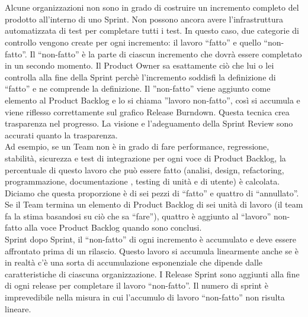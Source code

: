 \newpage
\section*{\color{Blue}{CONSIDERAZIONI FINALI}}
\label{sec:finalthoughts}
Alcune organizzazioni non sono in grado di costruire un incremento completo del prodotto all'interno di uno Sprint. Non possono ancora avere l'infrastruttura automatizzata di test per completare tutti i test. In questo caso, due categorie di controllo vengono create per ogni incremento: il lavoro ``fatto'' e quello ``non-fatto''. Il ``non-fatto'' \`e la parte di ciascun incremento che dovr\`a essere completato in un secondo momento. Il Product Owner sa esattamente ci\`o che lui o lei controlla alla fine della Sprint perch\`e l'incremento soddisfi la definizione di ``fatto'' e ne comprende la definizione. Il ''non-fatto'' viene aggiunto come elemento al Product Backlog e lo si chiama ''lavoro non-fatto'', cos\`i si accumula e viene riflesso correttamente sul grafico Release Burndown. Questa tecnica crea trasparenza nel progresso. La visione e l'adeguamento della Sprint Review sono accurati quanto la trasparenza.\\

Ad esempio, se un Team non \`e in grado di fare performance, regressione, stabilit\`a, sicurezza e test di integrazione per ogni voce di Product Backlog, la percentuale di questo lavoro che pu\`o essere fatto (analisi, design, refactoring, programmazione, documentazione , testing di unit\`a e di utente) \`e calcolata. Diciamo che questa proporzione \`e di sei pezzi di ``fatto'' e quattro di ``annullato''. Se il Team termina un elemento di Product Backlog di sei unit\`a di lavoro (il team fa la stima basandosi su ci\`o che sa ``fare''), quattro \`e aggiunto al ``lavoro'' non-fatto alla voce Product Backlog quando sono conclusi.\\

Sprint dopo Sprint, il ``non-fatto'' di ogni incremento \`e accumulato e deve essere affrontato prima di un rilascio. Questo lavoro si accumula linearmente anche se \`e in realt\`a c'\`e una sorta di accumulazione esponenziale che dipende dalle caratteristiche di ciascuna organizzazione. I Release Sprint sono aggiunti alla fine di ogni release per completare il lavoro ``non-fatto''.
Il numero di sprint \`e imprevedibile nella misura in cui l'accumulo di lavoro ``non-fatto'' non risulta lineare. 